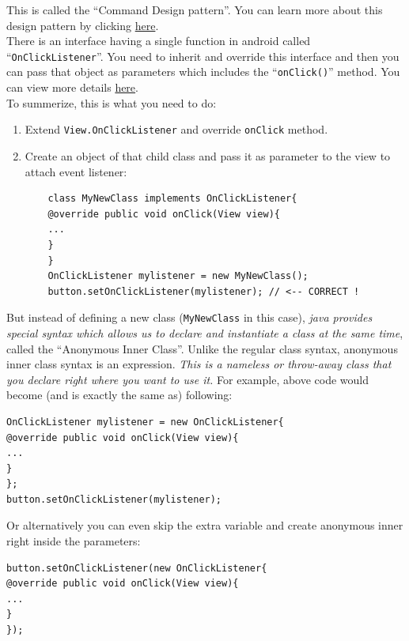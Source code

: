 This is called the ``Command Design pattern''. You can learn more about this design pattern by clicking \href{https://en.wikipedia.org/wiki/Command\_pattern}{here}.\\

There is an interface having a single function in android called ``\texttt{OnClickListener}''. You need to inherit and override this interface and then you can pass that object as parameters which includes the ``\texttt{onClick()}'' method. You can view more details \href{http://developer.android.com/reference/android/view/View.OnClickListener.html}{here}. \\

To summerize, this is what you need to do:
\begin{enumerate}
	\item Extend \texttt{View.OnClickListener} and override \texttt{onClick} method.
	\item Create an object of that child class and pass it as parameter to the view to attach event listener:
	\begin{verbatim}
	class MyNewClass implements OnClickListener{
	@override public void onClick(View view){
	...
	}
	}
	OnClickListener mylistener = new MyNewClass();
	button.setOnClickListener(mylistener); // <-- CORRECT !
	\end{verbatim}
	
\end{enumerate}

\vskip 3mm
But instead of defining a new class (\texttt{MyNewClass} in this case), \textit{java provides special syntax which allows us to declare and instantiate a class at the same time}, called the ``Anonymous Inner Class''. Unlike the regular class syntax, anonymous inner class syntax is an expression. \textit{This is a nameless or throw-away class that you declare right where you want to use it.} For example, above code would become (and is exactly the same as) following:

\begin{verbatim}
OnClickListener mylistener = new OnClickListener{
@override public void onClick(View view){ 
... 
} 
};
button.setOnClickListener(mylistener);
\end{verbatim}

Or alternatively you can even skip the extra variable and create anonymous inner right inside the parameters:

\begin{verbatim}
button.setOnClickListener(new OnClickListener{
@override public void onClick(View view){ 
... 
} 
});
\end{verbatim}


